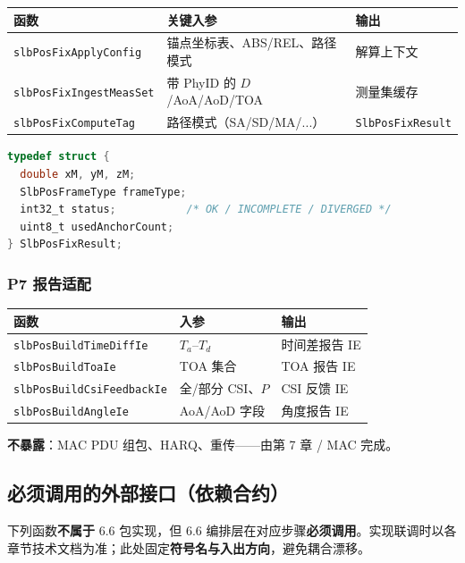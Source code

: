 \documentclass[11pt,a4paper]{ctexart}
\begin{document}
\begin{table}[h]
\centering
\small
\begin{tabular}{L{4.4cm}L{4.2cm}L{4.6cm}}
\toprule
\textbf{函数} & \textbf{关键入参} & \textbf{输出} \\
\midrule
\texttt{slbPosFixApplyConfig} & 锚点坐标表、ABS/REL、路径模式 & 解算上下文 \\
\texttt{slbPosFixIngestMeasSet} & 带 PhyID 的 $D$/AoA/AoD/TOA & 测量集缓存 \\
\texttt{slbPosFixComputeTag} & 路径模式（SA/SD/MA/...） & \texttt{SlbPosFixResult} \\
\bottomrule
\end{tabular}
\end{table}

\begin{lstlisting}[language=C,caption={坐标解算结果}]
typedef struct {
  double xM, yM, zM;
  SlbPosFrameType frameType;
  int32_t status;           /* OK / INCOMPLETE / DIVERGED */
  uint8_t usedAnchorCount;
} SlbPosFixResult;
\end{lstlisting}

\subsubsection{P7 报告适配}

\begin{table}[h]
\centering
\small
\begin{tabular}{L{4.6cm}L{4.2cm}L{4.4cm}}
\toprule
\textbf{函数} & \textbf{入参} & \textbf{输出} \\
\midrule
\texttt{slbPosBuildTimeDiffIe} & $T_a$--$T_d$ & 时间差报告 IE \\
\texttt{slbPosBuildToaIe} & TOA 集合 & TOA 报告 IE \\
\texttt{slbPosBuildCsiFeedbackIe} & 全/部分 CSI、$P$ & CSI 反馈 IE \\
\texttt{slbPosBuildAngleIe} & AoA/AoD 字段 & 角度报告 IE \\
\bottomrule
\end{tabular}
\end{table}

\textbf{不暴露}：MAC PDU 组包、HARQ、重传——由第 7 章 / MAC 完成。

\subsection{必须调用的外部接口（依赖合约）}

下列函数\textbf{不属于} 6.6 包实现，但 6.6 编排层在对应步骤\textbf{必须调用}。实现联调时以各章节技术文档为准；此处固定\textbf{符号名与入出方向}，避免耦合漂移。
\end{document}
